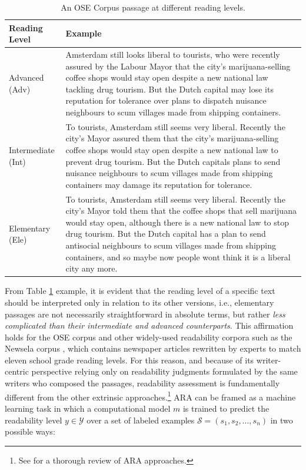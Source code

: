 \documentclass[a4paper, nobind]{templates/ociamthesis}
\begin{document}
\begin{table}

\caption{\label{tab:ose-example}An OSE Corpus passage at different reading levels.}
\centering
\begin{tabular}[t]{l>{\raggedright\arraybackslash}p{29em}}
\toprule
\textbf{Reading Level} & \textbf{Example}\\
\midrule
Advanced (Adv) & Amsterdam still looks liberal to tourists, who were recently assured by the Labour Mayor that the city’s marijuana-selling coffee shops would stay open despite a new national law tackling drug tourism. But the Dutch capital may lose its reputation for tolerance over plans to dispatch nuisance neighbours
to scum villages made from shipping containers.\\
\addlinespace\hline\addlinespace
Intermediate (Int) & To tourists, Amsterdam still seems very liberal. Recently the city’s Mayor assured them that the city’s marijuana-selling coffee shops would stay open despite a new national law to prevent drug tourism. But the Dutch capitals plans to send nuisance neighbours to scum villages made from shipping containers may damage its reputation for tolerance.\\
\addlinespace\hline\addlinespace
Elementary (Ele) & To tourists, Amsterdam still seems very liberal. Recently the city’s Mayor told them that the coffee shops that sell marijuana would stay open, although there is a new national law to stop drug tourism. But the Dutch capital has a plan to send antisocial neighbours to scum villages made from shipping containers, and so maybe now people wont think it is a liberal city any more.\\
\bottomrule
\end{tabular}
\end{table}

From Table \ref{tab:ose-example} example, it is evident that the reading level of a specific text should be interpreted only in relation to its other versions, i.e., elementary passages are not necessarily straightforward in absolute terms, but rather \emph{less complicated than their intermediate and advanced counterparts}. This affirmation holds for the OSE corpus and other widely-used readability corpora such as the Newsela corpus \autocite{xu-etal-2015-problems}, which contains newspaper articles rewritten by experts to match eleven school grade reading levels. For this reason, and because of its writer-centric perspective relying only on readability judgments formulated by the same writers who composed the passages, readability assessment is fundamentally different from the other extrinsic approaches.\footnote{See \textcite{collins-2014-computational} for a thorough review of ARA approaches.} ARA can be framed as a machine learning task in which a computational model \(m\) is trained to predict the readability level \(y \in \mathcal{Y}\) over a set of labeled examples \(\mathcal{S} = (s_1, s_2, \dots, s_n)\) in two possible ways:
\end{document}
